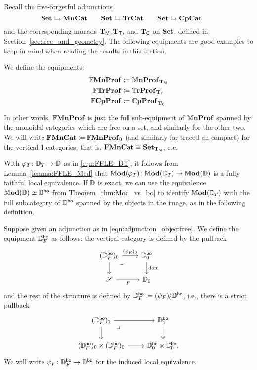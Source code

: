 \documentclass[11pt,oneside,article]{memoir}
\begin{document}
Recall the free-forgetful adjunctions
\[
   \mathbf{Set}\leftrightarrows\mathbf{MnCat}
   \qquad
   \mathbf{Set}\leftrightarrows\mathbf{TrCat}
   \qquad
   \mathbf{Set}\leftrightarrows\mathbf{CpCat}\qquad
\]
and the corresponding monads $\mathbf{T}_{\mathsf{M}},\mathbf{T}_{\mathsf{T}},$ and $\mathbf{T}_{\mathsf{C}}$ on $\mathbf{Set}$, defined in
Section~\ref{sec:free_and_geometry}. The following equipments are good examples to keep in mind when
reading the results in this section.

\begin{definition}
      \label{def:freeMon_equips}
   We define the equipments:
   \begin{align*}
      \mathbb{F}\mathbf{MnProf}  &\coloneqq \mathbb{M}\mathbf{nProf}_{\mathbf{T}_{\mathsf{M}}}   \\
      \mathbb{F}\mathbf{TrProf}   &\coloneqq \mathbb{T}\mathbf{rProf}_{\mathbf{T}_{\mathsf{T}}}     \\
      \mathbb{F}\mathbf{CpProf} &\coloneqq \mathbb{C}\mathbf{pProf}_{\mathbf{T}_{\mathsf{C}}}
   \end{align*}
\end{definition}

In other words, $\mathbb{F}\mathbf{MnProf}$ is just the full sub-equipment of $\mathbb{M}\mathbf{nProf}$ spanned by the monoidal
categories which are free on a set, and similarly for the other two. We will write
$\mathbf{FMnCat}\coloneqq\mathbb{F}\mathbf{MnProf}_0$ (and similarly for traced an compact) for the vertical
1-categories; that is, $\mathbf{FMnCat}\cong\mathbf{Set}_{\mathbf{T}_{\mathsf{M}}}$, etc.

With $\varphi_T\colon\mathbb{D}_T\to\mathbb{D}$ as in \eqref{eqn:FFLE_DT}, it follows from
Lemma~\ref{lemma:FFLE_Mod} that $\mathbb{M}\mathbf{od}(\varphi_T)\colon\mathbb{M}\mathbf{od}(\mathbb{D}_T)\to\mathbb{M}\mathbf{od}(\mathbb{D})$ is a
fully faithful local equivalence. If $\mathbb{D}$ is exact, we can use the equivalence
$\mathbb{M}\mathbf{od}(\mathbb{D})\simeq\mathbb{D}^{\mathsf{bo}}$ from Theorem~\ref{thm:Mod_vs_bo} to identify
$\mathbb{M}\mathbf{od}(\mathbb{D}_T)$ with the full subcategory of $\mathbb{D}^{\mathsf{bo}}$ spanned by the objects in the
image, as in the following definition.

\begin{definition}
      \label{def:DFbo}
   Suppose given an adjunction as in \eqref{eqn:adjunction_objectfree}. We define the equipment
   $\mathbb{D}_F^{\mathsf{bo}}$ as follows: the vertical category is defined by the pullback
   \[ \begin{tikzcd}
      (\dcat{D}_F^{\bo})_0 \ar[d] \ar[dr,phantom,"\lrcorner" very near start] \ar[r,"(\psi_F)_0"]
         &\dcat{D}_0^{\bo} \ar[d,"\dom"] \\
     \cat{S} \ar[r,"F"']
         & \dcat{D}_0
   \end{tikzcd} \]
   and the rest of the structure is defined by
   $\mathbb{D}_F^{\mathsf{bo}}\coloneqq(\psi_F)_0^*\mathbb{D}^{\mathsf{bo}}$, i.e., there is a strict pullback
   \[ \begin{tikzcd}
      (\dcat{D}_F^{\bo})_1 \ar[r] \ar[dr,phantom,"\lrcorner" very near start] \ar[d]
         & \dcat{D}_1^{\bo} \ar[d,two heads] \\
      (\dcat{D}_F^{\bo})_0\times(\dcat{D}_F^{\bo})_0 \ar[r]
         & \dcat{D}_0^{\bo}\times\dcat{D}_0^{\bo}.
   \end{tikzcd} \]
   We will write $\psi_F\colon\mathbb{D}_F^{\mathsf{bo}}\to\mathbb{D}^{\mathsf{bo}}$ for the induced local equivalence.
\end{definition}
\end{document}
